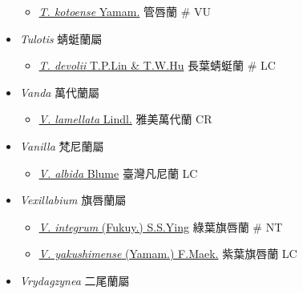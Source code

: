\begin{itemize}
  \begin{itemize}
        \item[] \href{http://www.theplantlist.org/tpl1.1/search?q=Tuberolabium+kotoense}{\textit{T. kotoense} Yamam.}   管唇蘭  \# VU
  \end{itemize}
 \item[] \textit{Tulotis} 蜻蜓蘭屬
                                
  \begin{itemize}
        \item[] \href{http://www.theplantlist.org/tpl1.1/search?q=Tulotis+devolii}{\textit{T. devolii} T.P.Lin \& T.W.Hu}   長葉蜻蜓蘭  \# LC
  \end{itemize}
 \item[] \textit{Vanda} 萬代蘭屬
                                
  \begin{itemize}
        \item[] \href{http://www.theplantlist.org/tpl1.1/search?q=Vanda+lamellata}{\textit{V. lamellata} Lindl.}   雅美萬代蘭   CR
  \end{itemize}
 \item[] \textit{Vanilla} 梵尼蘭屬
                                
  \begin{itemize}
        \item[] \href{http://www.theplantlist.org/tpl1.1/search?q=Vanilla+albida}{\textit{V. albida} Blume}   臺灣凡尼蘭   LC
  \end{itemize}
 \item[] \textit{Vexillabium} 旗唇蘭屬
                                
  \begin{itemize}
        \item[] \href{http://www.theplantlist.org/tpl1.1/search?q=Vexillabium+integrum}{\textit{V. integrum} (Fukuy.) S.S.Ying}   綠葉旗唇蘭  \# NT
        \item[] \href{http://www.theplantlist.org/tpl1.1/search?q=Vexillabium+yakushimense}{\textit{V. yakushimense} (Yamam.) F.Maek.}   紫葉旗唇蘭   LC
  \end{itemize}
 \item[] \textit{Vrydagzynea} 二尾蘭屬
                                

\end{itemize}
